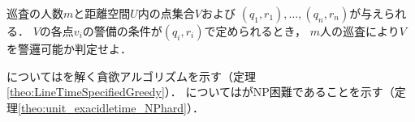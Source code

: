 \begin{timeSpecifiedPatrollingProblemDecision}
巡査の人数$m$と距離空間$U$内の点集合$V$および
$(q_1, r_1), \ldots, (q_n, r_n)$が与えられる．
$V$の各点$v_i$の警備の条件が{\exactIdletime}$(q_i, r_i)$で定められるとき，
$m$人の巡査により$V$を警邏可能か判定せよ．
\end{timeSpecifiedPatrollingProblemDecision}


{\graphLine}については{\timeSpecifiedPatProbDecision}を解く貪欲アルゴリズムを示す（定理\ref{theo:LineTimeSpecifiedGreedy}）．
{\graphUnit}については{\timeSpecifiedPatProb}がNP困難であることを示す（定理\ref{theo:unit_exacidletime_NPhard}）．
